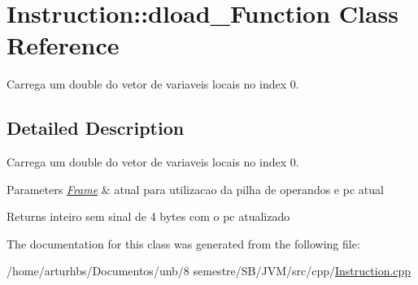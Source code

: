 \hypertarget{classInstruction_1_1dload__0Function}{}\section{Instruction\+:\+:dload\+\_\+Function Class Reference}
\label{classInstruction_1_1dload__0Function}


Carrega um double do vetor de variaveis locais no index 0.  




\subsection{Detailed Description}
Carrega um double do vetor de variaveis locais no index 0. 


\begin{DoxyParams}{Parameters}
{\em \hyperlink{classFrame}{Frame}} & atual para utilizacao da pilha de operandos e pc atual \\
\hline
\end{DoxyParams}
\begin{DoxyReturn}{Returns}
inteiro sem sinal de 4 bytes com o pc atualizado 
\end{DoxyReturn}


The documentation for this class was generated from the following file\+:\begin{DoxyCompactItemize}
\item 
/home/arturhbs/\+Documentos/unb/8 semestre/\+S\+B/\+J\+V\+M/src/cpp/\hyperlink{Instruction_8cpp}{Instruction.\+cpp}\end{DoxyCompactItemize}
